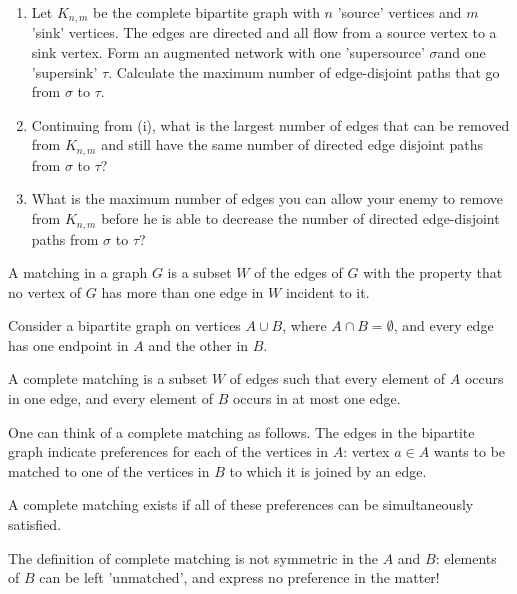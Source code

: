 \documentclass[10pt, a4paper]{article}
\begin{document}
\begin{example}
    \begin{enumerate}[label = (\roman*)]
        \item Let $K_{n, m}$ be the complete bipartite graph with $n$ 'source' vertices and $m$ 'sink' vertices.
        The edges are directed and all flow from a source vertex to a sink vertex.
        Form an augmented network with one 'supersource' $\sigma$and one 'supersink' $\tau$.
        Calculate the maximum number of edge-disjoint paths that go from $\sigma$ to $\tau$.

        \item Continuing from (i),
        what is the largest number of edges that can be removed from $K_{n, m}$ and still have the same number of directed edge disjoint paths from $\sigma$ to $\tau$?

        \item What is the maximum number of edges you can allow your enemy to remove from $K_{n, m}$ before he is able to decrease the number of directed edge-disjoint paths from $\sigma$ to $\tau$?
    \end{enumerate}
\end{example}

\begin{definition}
    A matching in a graph $G$ is a subset $W$ of the edges of $G$ with the property that no vertex of $G$ has more than one edge in $W$ incident to it.
\end{definition}

Consider a bipartite graph on vertices $A \cup B$,
where $A \cap B = \emptyset$,
and every edge has one endpoint in $A$ and the other in $B$.

\begin{definition}
    A complete matching is a subset $W$ of edges such that every element of $A$ occurs in one edge,
    and every element of $B$ occurs in at most one edge.
\end{definition}

One can think of a complete matching as follows.
The edges in the bipartite graph indicate preferences for each of the vertices in $A$:
vertex $a \in A$ wants to be matched to one of the vertices in $B$ to which it is joined by an edge.

A complete matching exists if all of these preferences can be simultaneously satisfied.

The definition of complete matching is not symmetric in the $A$ and $B$:
elements of $B$ can be left 'unmatched',
and express no preference in the matter!
\end{document}
